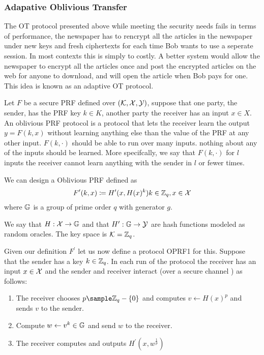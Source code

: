 \subsubsection{Adapative Oblivious Transfer}

The OT protocol presented above while meeting the security needs fails in terms of performance, the newspaper has to rencrypt all the articles in the newspaper under new keys and fresh ciphertexts for each time Bob wants to use a seperate session. In most contexts this is simply to costly. A better system would allow the newspaper to encrypt all the articles once and post the encrypted articles on the web for anyone to download, and will open the article when Bob pays for one. This idea is known as an adaptive OT protocol.

Let \(F\) be a secure PRF defined over \((\mathcal{K}, \mathcal{X}, \mathcal{Y})\), suppose that one party, the sender, has the PRF key \(k \in K\), another party the receiver has an input \( x \in X\). An oblivious PRF protocol is a protocol that lets the receiver learn the output \(y = F(k, x)\) without learning anything else than the value of the PRF at any other input. \(F(k, \cdot)\) should be able to run over many inputs. nothing about any of the inputs should be learned. More specifcally, we say that \(F(k, \cdot)\) for \(l\) inputs the receiver cannot learn anything with the sender in \(l\) or fewer times. 

We can design a Oblivious PRF defined as 
\[
    F^\prime(k, x) \coloneqq  H^\prime (x, H(x)^k) k \in \mathbb{Z}_q, x \in \mathcal{X}
\] 
where \(\mathbb{G}\) is a group of prime order \(q\) with generator \(g\). 

We say that \(H: \mathcal{X} \to \mathbb{G}\) and that \(H^\prime  : \mathbb{G} \to \mathcal{Y}\) are hash functions modeled as random oracles. The key space is \(\mathcal{K} = \mathbb{Z}_q\). 

Given our definition \(F^\prime \) let us now define a protocol OPRF1 for this. Suppose that the sender has a key \(k \in \mathbb{Z}_q\). In each run of the protocol the receiver has an input \( x \in \mathcal{X}\) and the sender and receiver interact (over a secure channel ) as follows: 
\begin{enumerate}
    \item The receiver chooses \(p \sample \Z_q - \{0\}\) and computes \(v \gets H(x)^p\) and sends \(v\) to the sender. 
    \item Compute \(w \gets v^k \in \mathbb{G}\) and send \(w\) to the receiver. 
    \item The receiver computes and outputs \(H^\prime (x, w^{\frac{1}{p}})\)      
\end{enumerate}


